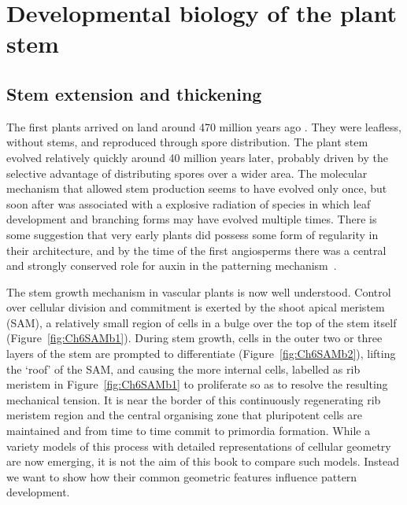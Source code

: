 \chapter[Developmental biology of the plant]{Developmental biology of the plant stem}
\label{ch:developmental}
\label{sec:bio}
\section{Stem extension and thickening}
The first plants arrived on land around 470 million years ago \cite{ingrouillePlantsDiversityEvolution2006,harrisonOriginEarlyEvolution2018}. They were leafless, without stems, and reproduced through spore distribution. The plant stem evolved relatively quickly around 40 million years later, probably driven by the selective advantage of distributing spores over a wider area.
The molecular mechanism that allowed stem production seems to have evolved only once, but soon after was associated with a explosive radiation of species in which leaf development and branching forms may have evolved multiple times. There is some suggestion that very early plants did possess some form of regularity in their architecture, and by the time of the first angiosperms there was a central and strongly conserved role for auxin in the patterning mechanism~\cite{reinhardtLawOrderPlants2022}.

The stem growth mechanism in vascular plants is now well understood. Control over cellular division and commitment is exerted by the shoot apical meristem (SAM), a relatively small region of cells in a bulge over the top of the stem itself (Figure~\ref{fig:Ch6SAMb1}). During stem growth, cells in the outer two or three layers of the stem are prompted to differentiate (Figure~\ref{fig:Ch6SAMb2}), lifting the `roof' of the SAM, and causing the more internal cells, labelled as rib meristem in Figure~\ref{fig:Ch6SAMb1} to proliferate so as to resolve the resulting mechanical tension. It is near the border of this continuously regenerating rib meristem region and the central organising zone that pluripotent cells are maintained and from time to time commit to primordia formation. While a variety models of this process with detailed representations of cellular geometry are now emerging,  it is not the aim of this book to compare such models. Instead we want to show how their common geometric features influence pattern development. 

